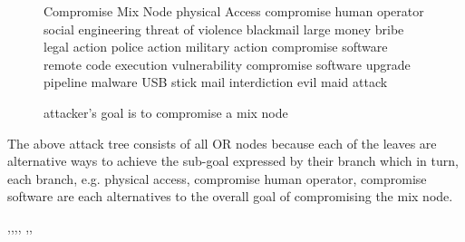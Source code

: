 \documentclass{article}
\begin{document}
\begin{figure}[ht!]
\centering
\begin{outline}[enumerate]
   \1 Compromise Mix Node
      \2 physical Access
      \2 compromise human operator
         \3 social engineering
         \3 threat of violence
         \3 blackmail
         \3 large money bribe
         \3 legal action
         \3 police action
         \3 military action
      \2 compromise software
         \3 remote code execution vulnerability
         \3 compromise software upgrade pipeline
         \3 malware
            \4 USB stick mail interdiction
            \4 evil maid attack
\end{outline}
\caption{attacker's goal is to compromise a mix node}
\end{figure}

The above attack tree consists of all OR nodes because each of the leaves are alternative ways to achieve the sub-goal expressed by their branch
which in turn, each branch, e.g. physical access, compromise human operator, compromise software are each alternatives to the overall goal of compromising
the mix node.





\pagebreak

,,,, ,,

\end{document}
